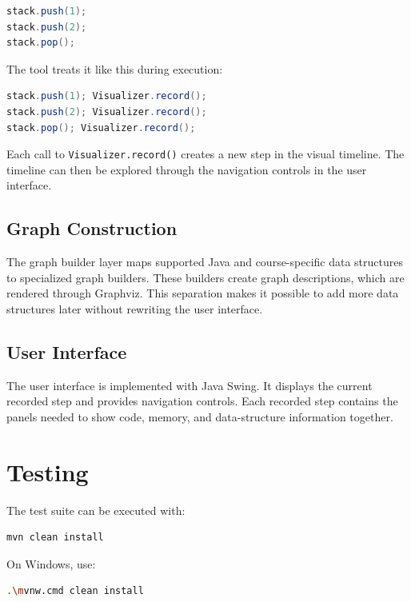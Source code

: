 \documentclass[12pt,a4paper]{article}
\begin{document}
\begin{lstlisting}[language=Java]
stack.push(1);
stack.push(2);
stack.pop();
\end{lstlisting}

The tool treats it like this during execution:

\begin{lstlisting}[language=Java]
stack.push(1); Visualizer.record();
stack.push(2); Visualizer.record();
stack.pop(); Visualizer.record();
\end{lstlisting}

Each call to \texttt{Visualizer.record()} creates a new step in the visual timeline. The timeline can then be explored through the navigation controls in the user interface.

\subsection{Graph Construction}

The graph builder layer maps supported Java and course-specific data structures to specialized graph builders. These builders create graph descriptions, which are rendered through Graphviz. This separation makes it possible to add more data structures later without rewriting the user interface.

\subsection{User Interface}

The user interface is implemented with Java Swing. It displays the current recorded step and provides navigation controls. Each recorded step contains the panels needed to show code, memory, and data-structure information together.

\section{Testing}

The test suite can be executed with:

\begin{lstlisting}[language=bash]
mvn clean install
\end{lstlisting}

On Windows, use:

\begin{lstlisting}[language=bash]
.\mvnw.cmd clean install
\end{lstlisting}
\end{document}
